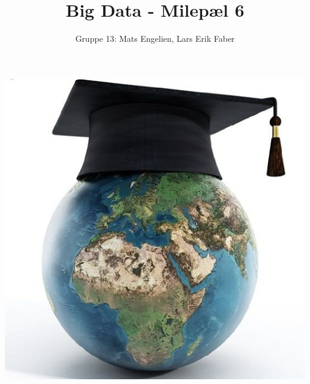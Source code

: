 \documentclass[12pt]{article}
\begin{document}
\title{Big Data - Milepæl 6}
\author{Gruppe 13: Mats Engelien, Lars Erik Faber}
\date{}
\maketitle
\begin{center}
    \includegraphics[scale=0.5]{images/world_education.jpg}    
\end{center}
\thispagestyle{empty}
\newpage
\tableofcontents
\thispagestyle{empty}
\newpage
\setcounter{page}{1}




\end{document}
